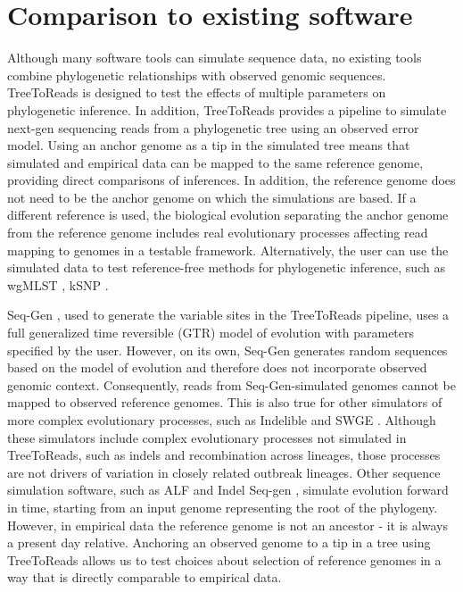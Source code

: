 \section*{Comparison to existing software}
Although many software tools can simulate sequence data, no existing tools combine phylogenetic relationships with observed genomic sequences.
TreeToReads is designed to test the effects of multiple parameters on phylogenetic inference.
In addition, TreeToReads provides a pipeline to simulate next-gen sequencing reads from a phylogenetic tree using an observed error model.
Using an anchor genome as a tip in the simulated tree means that simulated and empirical data can be mapped to the same reference genome, providing direct comparisons of inferences.
In addition, the reference genome does not need to be the anchor genome on which the simulations are based.
If a different reference is used, the biological evolution separating the anchor genome from the reference genome includes real evolutionary processes affecting read mapping to genomes in a testable framework.
Alternatively, the user can use the simulated data to test reference-free methods for phylogenetic inference, such as wgMLST , kSNP \citep{gardner_when_2013}.

Seq-Gen \citep{rambaut_seq-gen:_1997}, used to generate the variable sites in the TreeToReads pipeline, uses a full generalized time reversible (GTR) model of evolution  with parameters specified by the user.
However, on its own, Seq-Gen generates random sequences based on the model of evolution and therefore does not incorporate observed genomic context.
Consequently, reads from Seq-Gen-simulated genomes cannot be mapped to observed reference genomes.
This is also true for other simulators of more complex evolutionary processes, such as Indelible \citep{fletcher_indelible:_2009} and SWGE \citep{arenas_simulation_2014}.
Although these simulators include complex evolutionary processes not simulated in TreeToReads, such as indels and recombination across lineages, those processes are not drivers of variation in closely related outbreak lineages.
Other sequence simulation software, such as ALF \citep{dalquen_alfsimulation_2012} and Indel Seq-gen \citep{strope_indel-seq-gen:_2007}, simulate evolution forward in time, starting from an input  genome representing the root of the phylogeny.
However, in empirical data the reference genome is not an ancestor - it is always a present day relative.
Anchoring an observed genome to a tip in a tree using TreeToReads allows us to test choices about selection of reference genomes in a way that is directly comparable to empirical data. 



